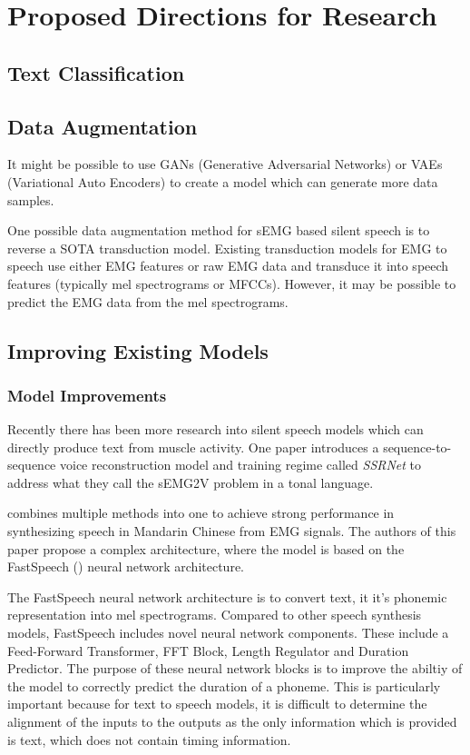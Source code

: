 \section{Proposed Directions for Research}

\subsection{Text Classification}

\subsection{Data Augmentation}

It might be possible to use GANs (Generative Adversarial Networks) or
VAEs (Variational Auto Encoders) to create a model which can generate
more data samples.

One possible data augmentation method for sEMG based silent speech is to
reverse a SOTA transduction model. Existing transduction models for
EMG to speech use either EMG features or raw EMG data and transduce
it into speech features (typically mel spectrograms or MFCCs). However,
it may be possible to predict the EMG data from the mel spectrograms.

\subsection{Improving Existing Models}

\subsubsection{Model Improvements}

Recently there has been more research into silent speech models which
can directly produce text from muscle activity. One paper introduces
a sequence-to-sequence voice reconstruction model and training regime
called \textit{SSRNet} to address what they call the sEMG2V problem
in a tonal language.

combines
multiple methods into one to achieve strong performance in synthesizing
speech in Mandarin Chinese from EMG signals. The authors of this paper
propose a complex architecture, where the model is based on the
FastSpeech (\cite{fastspeech}) neural network architecture.

The FastSpeech
neural network architecture is to convert text, it it's phonemic
representation into mel spectrograms. Compared to other speech
synthesis models, FastSpeech includes novel neural network components.
These include a Feed-Forward Transformer, FFT Block, Length Regulator
and Duration Predictor. The purpose of these neural network blocks
is to improve the abiltiy of the model to correctly predict the duration
of a phoneme. This is particularly important because for text to speech
models, it is difficult to determine the alignment of the inputs to
the outputs as the only information which is provided is text, which
does not contain timing information.

